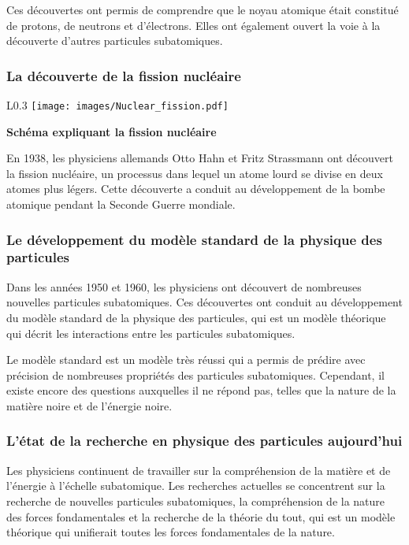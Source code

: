 Ces découvertes ont permis de comprendre que le noyau atomique était constitué de protons, de neutrons et d'électrons. Elles ont également ouvert la voie à la découverte d'autres particules subatomiques.


\subsubsection{La découverte de la fission nucléaire}

\begin{wrapfigure}[15]{L}{0.3\textwidth}
    \texttt{[image: images/Nuclear\_fission.pdf]}
    \begin{center}
        \bfseries Schéma expliquant la fission nucléaire
    \end{center}
\end{wrapfigure}

En 1938, les physiciens allemands Otto Hahn et Fritz Strassmann ont découvert la fission nucléaire, un processus dans lequel un atome lourd se divise en deux atomes plus légers. Cette découverte a conduit au développement de la bombe atomique pendant la Seconde Guerre mondiale.

\subsubsection{Le développement du modèle standard de la physique des particules}

Dans les années 1950 et 1960, les physiciens ont découvert de nombreuses nouvelles particules subatomiques. Ces découvertes ont conduit au développement du modèle standard de la physique des particules, qui est un modèle théorique qui décrit les interactions entre les particules subatomiques.

Le modèle standard est un modèle très réussi qui a permis de prédire avec précision de nombreuses propriétés des particules subatomiques. Cependant, il existe encore des questions auxquelles il ne répond pas, telles que la nature de la matière noire et de l'énergie noire.



\subsubsection{L'état de la recherche en physique des particules aujourd'hui}

Les physiciens continuent de travailler sur la compréhension de la matière et de l'énergie à l'échelle subatomique. Les recherches actuelles se concentrent sur la recherche de nouvelles particules subatomiques, la compréhension de la nature des forces fondamentales et la recherche de la théorie du tout, qui est un modèle théorique qui unifierait toutes les forces fondamentales de la nature.


